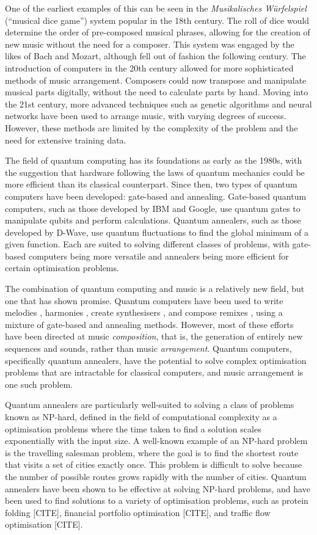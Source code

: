 \documentclass[aps,pra,10pt,twocolumn]{revtex4-2}
\begin{document}
One of the earliest examples of this can be seen in the \textit{Musikalisches Würfelspiel} (``musical dice game'') system popular in the 18th century. The roll of dice would determine the order of pre-composed musical phrases, allowing for the creation of new music without the need for a composer. This system was engaged by the likes of Bach and Mozart, although fell out of fashion the following century.
The introduction of computers in the 20th century allowed for more sophisticated methods of music arrangement. Composers could now transpose and manipulate musical parts digitally, without the need to calculate parts by hand. Moving into the 21st century, more advanced techniques such as genetic algorithms and neural networks have been used to arrange music, with varying degrees of success. However, these methods are limited by the complexity of the problem and the need for extensive training data.

The field of quantum computing has its foundations as early as the 1980s, with the suggestion that hardware following the laws of quantum mechanics could be more efficient than its classical counterpart. Since then, two types of quantum computers have been developed: gate-based and annealing. Gate-based quantum computers, such as those developed by IBM and Google, use quantum gates to manipulate qubits and perform calculations. Quantum annealers, such as those developed by D-Wave, use quantum fluctuations to find the global minimum of a given function. Each are suited to solving different classes of problems, with gate-based computers being more versatile and annealers being more efficient for certain optimisation problems. 

The combination of quantum computing and music is a relatively new field, but one that has shown promise. Quantum computers have been used to write melodies \cite{arya_music_2022}, harmonies \cite{freedline_algorhythms_2021}, create synthesisers \cite{miranda_hello_2020}, and compose remixes \cite{miranda_impossible_2022}, using a mixture of gate-based and annealing methods. However, most of these efforts have been directed at music \textit{composition}, that is, the generation of entirely new sequences and sounds, rather than music \textit{arrangement}. Quantum computers, specifically quantum annealers, have the potential to solve complex optimisation problems that are intractable for classical computers, and music arrangement is one such problem.

Quantum annealers are particularly well-suited to solving a class of problems known as NP-hard, defined in the field of computational complexity as a optimisation problems where the time taken to find a solution scales exponentially with the input size. A well-known example of an NP-hard problem is the travelling salesman problem, where the goal is to find the shortest route that visits a set of cities exactly once. This problem is difficult to solve because the number of possible routes grows rapidly with the number of cities. Quantum annealers have been shown to be effective at solving NP-hard problems, and have been used to find solutions to a variety of optimisation problems, such as protein folding [CITE], financial portfolio optimisation [CITE], and traffic flow optimisation [CITE].
\end{document}
